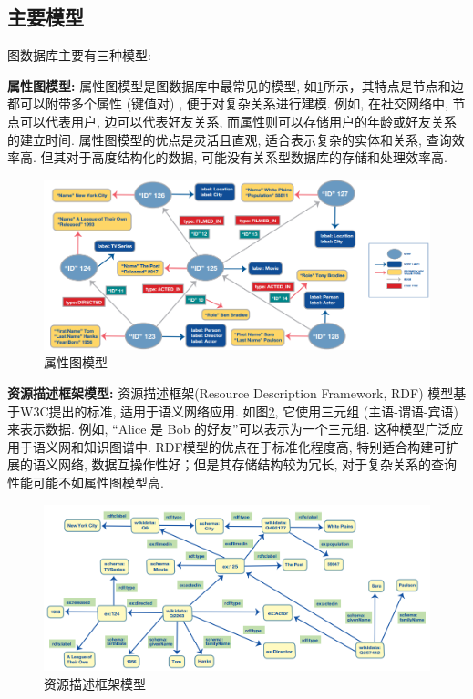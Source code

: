 \subsection{主要模型}

图数据库主要有三种模型:

\textbf{属性图模型:} 属性图模型是图数据库中最常见的模型, 如\cref{fig:property-graph}所示，其特点是节点和边都可以附带多个属性 (键值对) , 便于对复杂关系进行建模. 例如, 在社交网络中, 节点可以代表用户, 边可以代表好友关系, 而属性则可以存储用户的年龄或好友关系的建立时间. 属性图模型的优点是灵活且直观, 适合表示复杂的实体和关系, 查询效率高. 但其对于高度结构化的数据, 可能没有关系型数据库的存储和处理效率高.
\begin{figure}[H]
	\centering
	\includegraphics[width=\textwidth]{images/9.png}
	\caption{属性图模型}
	\label{fig:property-graph}
\end{figure}

\textbf{资源描述框架模型:} 资源描述框架(Resource Description Framework, RDF) 模型基于W3C提出的标准, 适用于语义网络应用. 如图\cref{fig:rdf}, 它使用三元组 (主语-谓语-宾语) 来表示数据. 例如, “Alice 是 Bob 的好友”可以表示为一个三元组. 这种模型广泛应用于语义网和知识图谱中. RDF模型的优点在于标准化程度高, 特别适合构建可扩展的语义网络, 数据互操作性好；但是其存储结构较为冗长, 对于复杂关系的查询性能可能不如属性图模型高.
\begin{figure}[H]
	\centering
	\includegraphics[width=\textwidth]{images/10.png}
	\caption{资源描述框架模型}
	\label{fig:rdf}
\end{figure}

